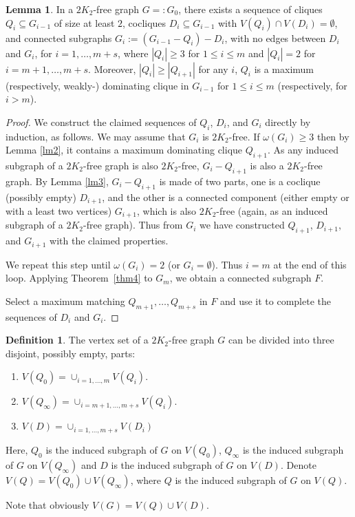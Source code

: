 \documentclass{amsart}
\theoremstyle{definition}
\newtheorem{lemma}{Lemma}
\newtheorem{definition}{Definition}
\begin{document}
\begin{lemma}\label{lm5}
In a $2K_2$-free graph $G=:G_0$, there exists a sequence of cliques
$Q_i\subseteq G_{i-1}$ of size at least $2$, cocliques $D_i\subseteq G_{i-1}$
with $V(Q_i)\cap V(D_i)=\emptyset$,  
and connected subgraphs $G_{i}:=(G_{i-1}-Q_{i})-D_{i}$, with
no edges between $D_i$ and $G_i$,  for
$i=1,\ldots,m+s$, where
$|Q_i|\ge3$ for $1\le i\le m$ and $|Q_i|=2$ for $i=m+1,\ldots,m+s$.
Moreover, $|Q_i|\ge|Q_{i+1}|$ for any $i$, $Q_i$ is a maximum
(respectively, weakly-) dominating
clique in $G_{i-1}$ for $1\leq i\leq m$ (respectively, for $i>m$).
\end{lemma}
\begin{proof}
We construct the claimed sequences of $Q_i$, $D_i$, 
and $G_i$ directly by induction, as follows. 
We may assume that $G_i$ is $2K_2$-free.
If $\omega(G_i)\ge3$ then by Lemma \ref{lm2}, it contains a 
maximum dominating clique $Q_{i+1}$.
As any induced subgraph of a $2K_2$-free
graph is also $2K_2$-free, $G_i-Q_{i+1}$ is also a $2K_2$-free graph.
By Lemma \ref{lm3}, $G_i-Q_{i+1}$ is made of two parts, one is a coclique
(possibly empty) $D_{i+1}$, and the other is a connected
component (either empty or with a least two vertices) $G_{i+1}$, which is also
$2K_2$-free (again, as an induced subgraph of a $2K_2$-free graph).
Thus from $G_i$ we have constructed $Q_{i+1}$, $D_{i+1}$, and $G_{i+1}$
with the  claimed properties.

We repeat this step until $\omega(G_i)=2$ (or $G_i=\emptyset$).
Thus $i=m$ at the end of this loop.
Applying Theorem~\ref{thm4} to $G_m$, we obtain
a connected subgraph $F$.%

Select a maximum matching $Q_{m+1},\dots, Q_{m+s}$ in $F$
and use it to complete the sequences of $D_i$ and $G_i$. 
\end{proof}


\begin{definition}\label{lm6}
The vertex set of a $2K_2$-free graph $G$ can be divided into three disjoint, 
possibly empty, parts:
\begin{enumerate}
\item $V(Q_0)=\cup_{i=1,\ldots,m}V(Q_i).$\label{Vq0}
\item $V(Q_{\infty})=\cup_{i=m+1,\ldots,m+s}V(Q_i).$\label{Vqinfty}
\item $V(D)=\cup_{i=1,\ldots,m+s}V(D_i)$\label{Vd}
\end{enumerate}
Here, $Q_0$ is the induced subgraph of $G$ on $V(Q_0)$, $Q_{\infty}$ is the induced subgraph of $G$ on $V(Q_{\infty})$ and $D$ is the induced subgraph of $G$ on $V(D)$. 
Denote $V(Q)=V(Q_0)\cup V(Q_{\infty})$, where $Q$ is the induced subgraph of $G$ on $V(Q)$. 
\end{definition}
Note that obviously $V(G)=V(Q)\cup V(D)$.
\end{document}
